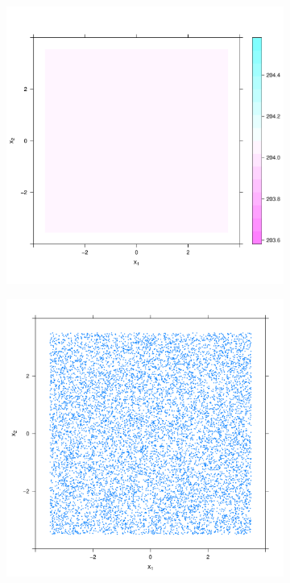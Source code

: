\begin{figure}[htbp]
    \centering
    \begin{subfigure}[t]{0.32\textwidth}
        \includegraphics[width=\textwidth]{output/population-heatmap}
        \label{fig:cases_scatter:unif_100_1.0_1h:popdist}
    \end{subfigure}
    \begin{subfigure}[t]{0.32\textwidth}
        \includegraphics[width=\textwidth]{output/population-points}

\end{subfigure}
\end{figure}
